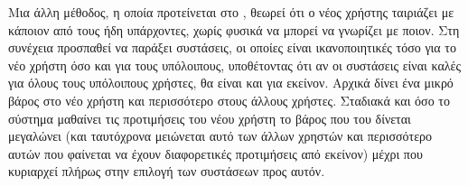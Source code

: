Μια άλλη μέθοδος, η οποία προτείνεται στο \cite{DBLP:conf/um/Masthoff03}, θεωρεί ότι ο νέος χρήστης ταιριάζει με κάποιον από τους ήδη υπάρχοντες, χωρίς φυσικά να μπορεί να γνωρίζει με ποιον. Στη συνέχεια προσπαθεί να παράξει συστάσεις, οι οποίες είναι ικανοποιητικές τόσο για το νέο χρήστη όσο και για τους υπόλοιπους, υποθέτοντας ότι αν οι συστάσεις είναι καλές για όλους τους υπόλοιπους χρήστες, θα είναι και για εκείνον. Αρχικά δίνει ένα μικρό βάρος στο νέο χρήστη και περισσότερο στους άλλους χρήστες. Σταδιακά και όσο το σύστημα μαθαίνει τις προτιμήσεις του νέου χρήστη το βάρος που του δίνεται μεγαλώνει (και ταυτόχρονα μειώνεται αυτό των άλλων χρηστών και περισσότερο αυτών που φαίνεται να έχουν διαφορετικές προτιμήσεις από εκείνον) μέχρι που κυριαρχεί πλήρως στην επιλογή των συστάσεων προς αυτόν.\par
